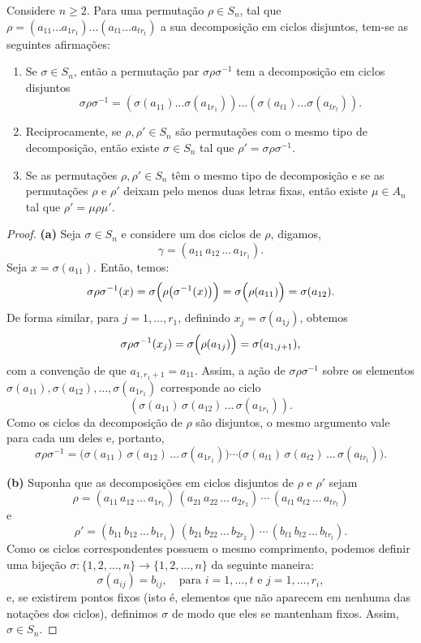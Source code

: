 \documentclass[11pt,openany]{book}
\newenvironment{novo}{
    \color{red}
}{}
\begin{document}
\begin{novo}
\begin{lemma}
\label{lemma:decomposicao_permutacao}
    Considere $n \geq 2$. Para uma permutação $\rho \in S_n$, tal que $\rho = (a_{11} \dots a_{1r_1}) \dots (a_{t1} \dots a_{tr_t})$ a sua decomposição em ciclos disjuntos, tem-se as seguintes afirmações:
    \begin{enumerate}[label=\alph*)]
        \item Se $\sigma \in S_n$, então a permutação par $\sigma\rho\sigma^{-1}$ tem a decomposição em ciclos disjuntos
            \[\sigma\rho\sigma^{-1} = (\sigma(a_{11})\dots\sigma(a_{1r_1}))\dots(\sigma(a_{t1})\dots\sigma(a_{tr_t})).\]
        \item Reciprocamente, se $\rho, \rho' \in S_n$ são permutações com o mesmo tipo de decomposição, então existe $\sigma \in S_n$ tal que $\rho' = \sigma\rho\sigma^{-1}$.
        \item Se as permutações $\rho, \rho' \in S_n$ têm o mesmo tipo de decomposição e se as permutações $\rho$ e $\rho'$ deixam pelo menos duas letras fixas, então existe $\mu \in A_n$ tal que $\rho' = \mu\rho\mu'$.
    \end{enumerate}
\end{lemma}
\begin{proof}
    \textbf{(a)} Seja $\sigma\in S_n$ e considere um dos ciclos de $\rho$, digamos,
    \[
    \gamma=(a_{11}\,a_{12}\,\dots\,a_{1r_1}).
    \]
    Seja $x=\sigma(a_{11})$. Então, temos:
    \[
    \sigma\rho\sigma^{-1}(x)=\sigma\Bigl(\rho\bigl(\sigma^{-1}(x)\bigr)\Bigr)=\sigma\Bigl(\rho(a_{11})\Bigr)=\sigma(a_{12}).
    \]
    De forma similar, para $j=1,\dots,r_1$, definindo $x_j=\sigma(a_{1j})$, obtemos
    \[
    \sigma\rho\sigma^{-1}(x_j)=\sigma\Bigl(\rho(a_{1j})\Bigr)=\sigma(a_{1,j+1}),
    \]
    com a convenção de que $a_{1,r_1+1}=a_{11}$. Assim, a ação de $\sigma\rho\sigma^{-1}$ sobre os elementos $\sigma(a_{11}),\sigma(a_{12}),\dots,\sigma(a_{1r_1})$ corresponde ao ciclo
    \[
    (\sigma(a_{11})\,\sigma(a_{12})\,\dots\,\sigma(a_{1r_1})).
    \]
    Como os ciclos da decomposição de $\rho$ são disjuntos, o mesmo argumento vale para cada um deles e, portanto,
    \[
    \sigma\rho\sigma^{-1} = \bigl(\sigma(a_{11})\,\sigma(a_{12})\,\dots\,\sigma(a_{1r_1})\bigr)
    \cdots
    \bigl(\sigma(a_{t1})\,\sigma(a_{t2})\,\dots\,\sigma(a_{tr_t})\bigr).
    \]

    \bigskip

    \textbf{(b)} Suponha que as decomposições em ciclos disjuntos de $\rho$ e $\rho'$ sejam
    \[
    \rho = (a_{11}\,a_{12}\,\dots\,a_{1r_1})\,(a_{21}\,a_{22}\,\dots\,a_{2r_2})\,\cdots\,(a_{t1}\,a_{t2}\,\dots\,a_{tr_t})
    \]
    e
    \[
    \rho' = (b_{11}\,b_{12}\,\dots\,b_{1r_1})\,(b_{21}\,b_{22}\,\dots\,b_{2r_2})\,\cdots\,(b_{t1}\,b_{t2}\,\dots\,b_{tr_t}).
    \]
    Como os ciclos correspondentes possuem o mesmo comprimento, podemos definir uma bijeção $\sigma:\{1,2,\dots,n\}\to\{1,2,\dots,n\}$ da seguinte maneira:
    \[
    \sigma(a_{ij})=b_{ij},\quad \text{para } i=1,\dots,t \text{ e } j=1,\dots,r_i,
    \]
    e, se existirem pontos fixos (isto é, elementos que não aparecem em nenhuma das notações dos ciclos), definimos $\sigma$ de modo que eles se mantenham fixos. Assim, $\sigma\in S_n$.


\end{proof}
\end{novo}
\end{document}
